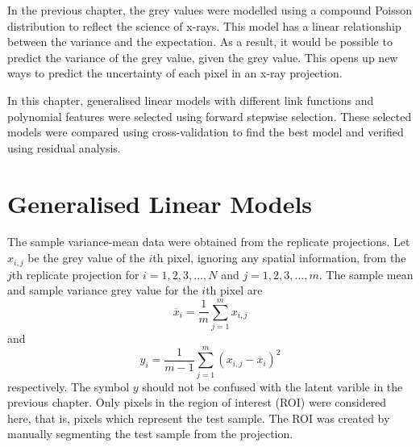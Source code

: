 In the previous chapter, the grey values were modelled using a compound Poisson distribution to reflect the science of x-rays. This model has a linear relationship between the variance and the expectation. As a result, it would be possible to predict the variance of the grey value, given the grey value. This opens up new ways to predict the uncertainty of each pixel in an x-ray projection.

In this chapter, generalised linear models \citep{nelder1972generalized, nelder1972generalized_2, mccullagh1984generalized} with different link functions and polynomial features were selected using forward stepwise selection. These selected models were compared using cross-validation to find the best model and verified using residual analysis.

\section{Generalised Linear Models}

The sample variance-mean data were obtained from the replicate projections. Let $x_{i,j}$ be the grey value of the $i$th pixel, ignoring any spatial information, from the $j$th replicate projection for $i=1,2,3,\ldots,N$ and $j=1,2,3,\ldots,m$. The sample mean and sample variance grey value for the $i$th pixel are
\begin{equation}
    \overline{x}_{i}=\frac{1}{m}\sum_{j=1}^m x_{i,j}
\end{equation}
and
\begin{equation}
    y_{i} =
    \frac{1}{m-1}
    \sum_{j=1}^m
        \left(
            x_{i,j} - \overline{x}_{i}
        \right)^2
\end{equation}
respectively. The symbol $y$ should not be confused with the latent varible in the previous chapter. Only pixels in the region of interest (ROI) were considered here, that is, pixels which represent the test sample. The ROI was created by manually segmenting the test sample from the projection.


